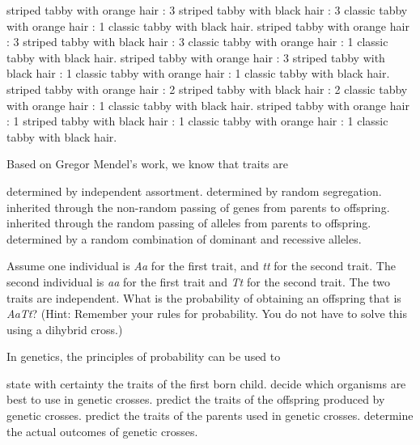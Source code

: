 \begin{choices}
 striped tabby with orange hair : 3 striped tabby with black hair : 3 classic tabby with orange hair : 1 classic tabby with black hair.
 striped tabby with orange hair : 3 striped tabby with black hair : 3 classic tabby with orange hair : 1 classic tabby with black hair. 
 striped tabby with orange hair : 3 striped tabby with black hair : 1 classic tabby with orange hair : 1 classic tabby with black hair.
 striped tabby with orange hair : 2 striped tabby with black hair : 2 classic tabby with orange hair : 1 classic tabby with black hair.
 striped tabby with orange hair : 1 striped tabby with black hair : 1 classic tabby with orange hair : 1 classic tabby with black hair.
\end{choices}

\question
Based on Gregor Mendel's work, we know that traits are

\begin{choices}
\choice determined by independent assortment.
\choice determined by random segregation.
\choice inherited through the non-random passing of genes from parents to offspring.
\correctchoice inherited through the random passing of alleles from parents to offspring.
\choice determined by a random combination of dominant and recessive alleles.
\end{choices}

\newpage

\question
Assume one individual is \textit{Aa} for the first trait, and \textit{tt} for the second trait. The second individual is \textit{aa} for the first trait and \textit{Tt} for the second trait. The two traits are independent.  What is the probability of obtaining an offspring that is \textit{AaTt}? (Hint: Remember your rules for probability. You do not have to solve this using a dihybrid cross.)

\begin{choices}
\end{choices}

\question
In genetics, the principles of probability can be used to

\begin{choices}
\choice state with certainty the traits of the first born child.
\choice decide which organisms are best to use in genetic crosses.
\correctchoice predict the traits of the offspring produced by genetic crosses.
\choice predict the traits of the parents used in genetic crosses.
\choice determine the actual outcomes of genetic crosses.
\end{choices}

